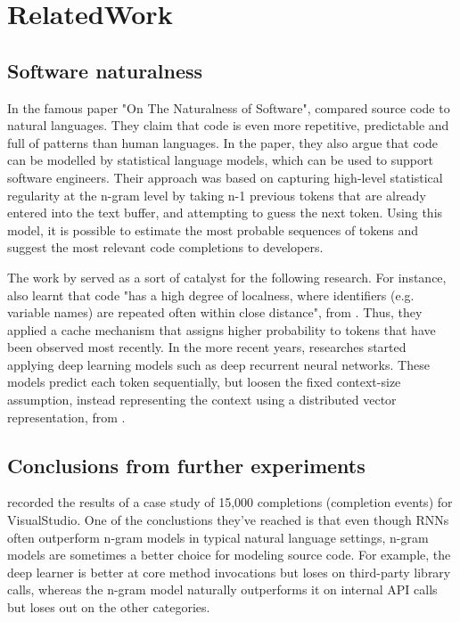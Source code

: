 \chapter{RelatedWork}
\label{chap:RelatedWork}

\section{Software naturalness}
In the famous paper "On The Naturalness of Software", \cite{Hind12a} compared source code
to natural languages. They claim that code is even more repetitive, predictable and full of
patterns than human languages. In the paper, they also argue that code can be modelled by
statistical language models, which can be used to support software engineers. Their approach
was based on capturing high-level statistical regularity at the n-gram level by taking n-1
previous tokens that are already entered into the text buffer, and attempting to guess the
next token. Using this model, it is possible to estimate the most probable sequences of tokens
and suggest the most relevant code completions to developers.

The work by \cite{Hind12a} served as a sort of catalyst for the following research. For
instance, \cite{Tu14a} also learnt that code "has a high degree of localness, where identifiers
(e.g. variable names) are repeated often within close distance", from \cite{Alla18a}. Thus,
they applied a cache mechanism that assigns higher probability to tokens that have been observed
most recently. In the more recent years, researches started applying deep learning models such
as deep recurrent neural networks. These models predict each token sequentially, but loosen the
fixed context-size assumption, instead representing the context using a distributed vector
representation, from \cite{Alla18a}.

\section{Conclusions from further experiments}
\cite{Hell19a} recorded the results of a case study of 15,000 completions
(completion events) for VisualStudio. One of the conclustions they've reached is that even though
RNNs often outperform n-gram models in typical natural language settings, n-gram models are
sometimes a better choice for modeling source code. For example, the deep learner is better at
core method invocations but loses on third-party library calls, whereas the n-gram model
naturally outperforms it on internal API calls but loses out on the other categories.

